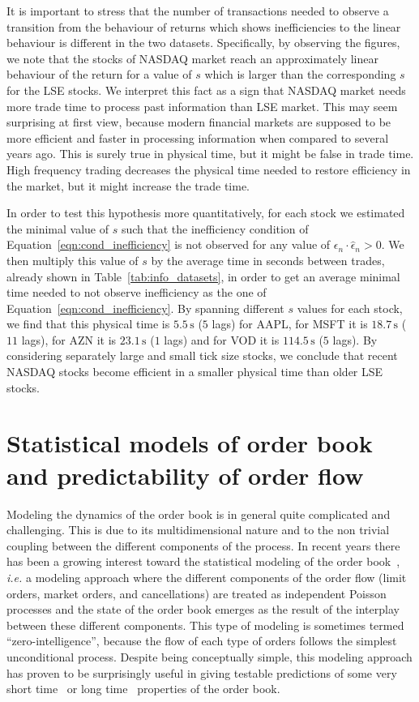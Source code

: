 \documentclass[12pt]{iopart}
\begin{document}
It is important to stress that the number of transactions needed to observe a transition from the behaviour of returns which shows inefficiencies to the linear behaviour is different in the two datasets. Specifically, by observing the figures, we note that the stocks of NASDAQ market reach an approximately linear behaviour of the return for a value of $s$ which is larger than the corresponding $s$ for the LSE stocks. We interpret this fact as a sign that NASDAQ market needs more trade time to process past information than LSE market. This may seem surprising at first view, because modern financial markets are supposed to be more efficient and faster in processing information when compared to several years ago. This is surely true in physical time, but it might be false in trade time. High frequency trading decreases the physical time needed to restore efficiency in the market, but it might increase the trade time.

In order to test this hypothesis more quantitatively, for each stock we estimated the minimal value of $s$ such that the inefficiency condition of Equation~\ref{eqn:cond_inefficiency} is not observed for any value of $\epsilon_n\cdot\hat{\epsilon}_n>0$. We then multiply this value of $s$ by the average time in seconds between trades, already shown in Table~\ref{tab:info_datasets}, in order to get an average minimal time needed to not observe inefficiency as the one of Equation~\ref{eqn:cond_inefficiency}. By spanning  different $s$ values for each stock, we find that this physical time is $5.5\,\mathrm{s}$ ($5$ lags) for AAPL, for MSFT it is $18.7\,\mathrm{s}$ ($11$ lags), for AZN it is $23.1\,\mathrm{s}$ ($1$ lags) and for VOD it is $114.5\,\mathrm{s}$ ($5$ lags). By considering separately large and small tick size stocks, we conclude that recent NASDAQ stocks become efficient in a smaller physical time than older LSE stocks.

\section{Statistical models of order book and predictability of order flow}
\label{sec:Statistical}
Modeling the dynamics of the order book is in general quite complicated and challenging. This is due to its multidimensional nature and to the non trivial coupling between the different components of the process. In recent years there has been a growing interest toward the statistical modeling of the order book~\cite{smith2003statistical}, \textit{i.e.} a modeling approach where the different components of the order flow (limit orders, market orders, and cancellations) are treated as independent Poisson processes and the state of the order book emerges as the result of the interplay between these different components. This type of modeling is sometimes termed “zero-intelligence”, because the flow of each type of orders follows the simplest unconditional process. Despite being conceptually simple, this modeling approach has proven to be surprisingly useful in giving testable predictions of some very short time~\cite{cont2013price} or long time~\cite{farmer2005predictive} properties of the order book. 
\end{document}
